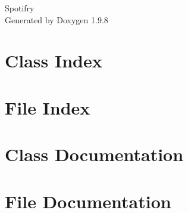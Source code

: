 \documentclass[twoside]{book}
\newcommand{\+}{\discretionary{\mbox{\scriptsize$\hookleftarrow$}}{}{}}
\newcommand{\clearemptydoublepage}{%
    \newpage{\pagestyle{empty}\cleardoublepage}%
  }
\begin{document}
  \raggedbottom
    \hypersetup{pageanchor=false,
                bookmarksnumbered=true,
                pdfencoding=unicode
               }
  \begin{titlepage}
  \vspace*{7cm}
  \begin{center}%
  {\Large Spotifry}\\
  \vspace*{1cm}
  {\large Generated by Doxygen 1.9.8}\\
  \end{center}
  \end{titlepage}
  \clearemptydoublepage
  \tableofcontents
  \clearemptydoublepage
  \hypersetup{pageanchor=true}
\chapter{Class Index}

\chapter{File Index}

\chapter{Class Documentation}












\chapter{File Documentation}


































  \backmatter
  \newpage
  \clearemptydoublepage
  \printindex
\end{document}
